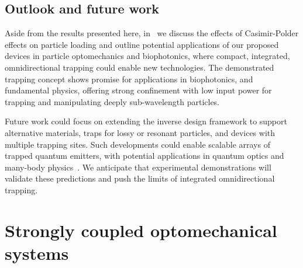 \subsection*{Outlook and future work}

Aside from the results presented here, in~\cite{ownpub2} we discuss the effects of Casimir-Polder effects
 on particle loading and outline potential applications of our proposed devices in particle optomechanics
  and biophotonics, where compact, integrated, omnidirectional trapping could
   enable new technologies. The demonstrated trapping concept shows promise for applications in biophotonics, and fundamental physics,
    offering strong confinement with low input power for trapping and manipulating deeply sub-wavelength particles.

Future work could focus on extending the inverse design framework to support alternative materials, 
traps for lossy or resonant particles, and devices with multiple trapping sites.
 Such developments could enable scalable arrays of trapped quantum emitters, with potential applications
  in quantum optics and many-body physics~\cite{chang_colloquium_2018}. We anticipate that experimental demonstrations
   will validate these predictions and push the limits of integrated omnidirectional trapping.

\section{Strongly coupled optomechanical systems~\cite{ownpub5}}\label{sec:mech_strongly_coupled}

